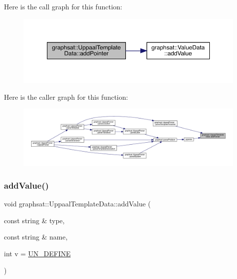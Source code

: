 Here is the call graph for this function\+:
\nopagebreak
\begin{figure}[H]
\begin{center}
\leavevmode
\includegraphics[width=350pt]{classgraphsat_1_1_uppaal_template_data_ab6ba35a0dce5f2ac086e11361aafcaec_cgraph}
\end{center}
\end{figure}
Here is the caller graph for this function\+:
\nopagebreak
\begin{figure}[H]
\begin{center}
\leavevmode
\includegraphics[width=350pt]{classgraphsat_1_1_uppaal_template_data_ab6ba35a0dce5f2ac086e11361aafcaec_icgraph}
\end{center}
\end{figure}
\mbox{\label{classgraphsat_1_1_uppaal_template_data_aa79e5565c392d285cba2bf2e3b874f77}} 
\subsubsection{\texorpdfstring{addValue()}{addValue()}}
{\footnotesize\ttfamily void graphsat\+::\+Uppaal\+Template\+Data\+::add\+Value (\begin{DoxyParamCaption}\item[{const string \&}]{type,  }\item[{const string \&}]{name,  }\item[{int}]{v = {\ttfamily \mbox{\hyperlink{namespacegraphsat_ac495a5bfce375af1b4d9a8e3f75bef9e}{U\+N\+\_\+\+D\+E\+F\+I\+NE}}} }\end{DoxyParamCaption})\hspace{0.3cm}{\ttfamily [inline]}}

